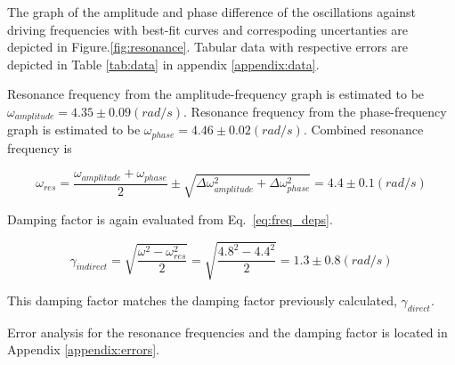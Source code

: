 The graph of the amplitude and phase difference of the oscillations against driving frequencies with best-fit curves and correspoding uncertanties are depicted in Figure.\ref{fig:resonance}. Tabular data with respective errors are depicted in Table \ref{tab:data} in appendix \ref{appendix:data}.

Resonance frequency from the amplitude-frequency graph is estimated to be $\omega_{amplitude} = 4.35 \pm 0.09 (rad/s)$. Resonance frequency from the phase-frequency graph is estimated to be $\omega_{phase} = 4.46 \pm 0.02 (rad/s)$. Combined resonance frequency is

\begin{equation*}
\omega_{res} = \frac{\omega_{amplitude} + \omega_{phase}}{2} \pm \sqrt{\Delta\omega_{amplitude}^2 + \Delta\omega_{phase}^2} = 4.4 \pm 0.1 (rad/s)
\end{equation*}

Damping factor is again evaluated from Eq.~\ref{eq:freq_deps}.

\begin{equation*}
        \gamma_{indirect} = \sqrt{ \frac{\omega^2 - \omega_{res}^2}{2} } = \sqrt{ \frac{4.8^2 - 4.4^2}{2} } = 1.3 \pm 0.8 (rad/s)
\end{equation*}       

This damping factor matches the damping factor previously calculated, $\gamma_{direct}$.

Error analysis for the resonance frequencies and the damping factor is located in Appendix \ref{appendix:errors}.

